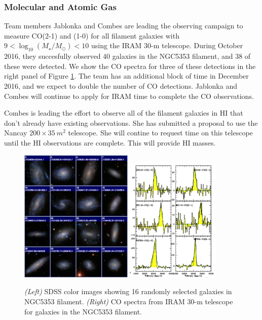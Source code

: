 \documentclass[12pt, preprint]{aastex}
\begin{document}
\vspace*{-1cm}
\subsubsection{Molecular and Atomic Gas}
\vspace*{-.3cm}
Team members Jablonka and Combes are leading the observing campaign to
measure CO(2-1) and (1-0)  for all filament galaxies with $9 <
\log_{10}(M_\star/M_\odot) < 10$ using the IRAM 30-m telescope.
During October 2016, they succesfully observed 40 galaxies in the
NGC5353 filament, and 38 of these were detected.  We show the CO
spectra for three of these detections in the right panel of Figure
\ref{sdssCO}.  The team has an additional block of time in December
2016, and we expect to double the number of CO detections.  Jablonka
and Combes will continue to apply for IRAM time to complete the CO observations.

Combes is leading the effort to observe all of the filament galaxies
in HI that don't already have existing observations.  She has
submitted a proposal to use the Nancay $200 \times 35~m^2$ telescope.
She will contine to request time on this telescope until the HI
observations are complete.  This will provide HI masses.

\begin{figure}[h]
\centering
\includegraphics[width=0.48\textwidth]{sdss-montage.png}
\includegraphics[width=0.4\textwidth]{CO-detection.png}
\caption{\small {\it (Left)} SDSS color images showing 16 randomly
  selected galaxies in NGC5353 filament.  {\it (Right)} CO spectra
  from IRAM 30-m telescope for galaxies in the NGC5353 filament.  }
\label{sdssCO}
\end{figure}
\end{document}
